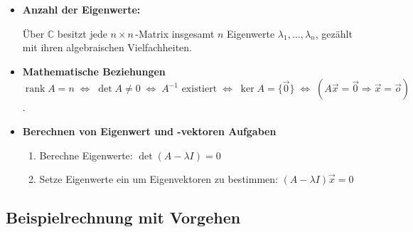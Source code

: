 \documentclass[a4paper,11pt,oneside,open=any,parskip=half, DIV=15]{scrreprt}
\begin{document}
\begin{itemize}
\begin{itemize}
            \begin{itemize}
               \item Ordnung, mit der ein Eigenwert \( \lambda \) als Nullstelle des charakteristischen Polynoms auftritt \( \Rightarrow \) also wie oft kommt \( \lambda \) im Polynom vor
            \end{itemize}

            \item \textbf{geometrische Vielfachheit} \( m_{geo}(\lambda) \)

            \begin{itemize}
               \item Dimension des Eigenraums, also die Anzahl der linear unabhängigen Eigenvektoren zu \( \lambda \)
            \end{itemize}

            \item Diagonaliserbar \(\Leftrightarrow \) für alle Eigenwerte \(\lambda\) gilt \(m_{geo}(\lambda) = m_{alg}(\lambda)\)
         \end{itemize}

      \item \textbf{Anzahl der Eigenwerte:}

      Über \(\mathbb{C}\) besitzt jede \(n\times n\)\,-Matrix insgesamt \(n\) Eigenwerte \(\lambda_1, \ldots, \lambda_n\), gezählt mit ihren algebraischen Vielfachheiten.

      \item \textbf{Mathematische Beziehungen}\\
      \( \operatorname{rank} A = n \;\Leftrightarrow\; \det A \neq 0 \;\Leftrightarrow\; A^{-1}\text{ existiert} \;\Leftrightarrow\; \ker A = \{\vec 0\} \;\Leftrightarrow\; (A\vec x=\vec 0 \Rightarrow \vec x=\vec o)\).


      \item \textbf{Berechnen von Eigenwert und -vektoren Aufgaben}
         \begin{enumerate}
            \item Berechne Eigenwerte: \( \det (A - \lambda I) = 0 \)
            \item Setze Eigenwerte ein um Eigenvektoren zu bestimmen: \( (A - \lambda I)\vec{x} = 0 \)
         \end{enumerate}

   \end{itemize}

   \subsection*{Beispielrechnung mit Vorgehen}
\end{document}
